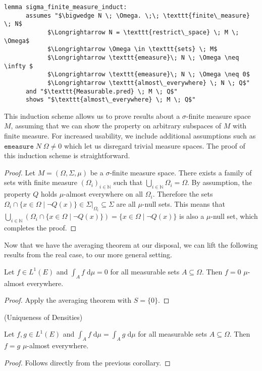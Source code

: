 \begin{isalemma}
{\small
	\begin{lstlisting}[style=isabelle]
	lemma sigma_finite_measure_induct:
	  assumes "$\bigwedge N \; \Omega. \;\; \texttt{finite\_measure} \; N$
			$\Longrightarrow N = \texttt{restrict\_space} \; M \; \Omega$
			$\Longrightarrow \Omega \in \texttt{sets} \; M$
			$\Longrightarrow \texttt{emeasure}\; N \; \Omega \neq \infty $
			$\Longrightarrow \texttt{emeasure}\; N \; \Omega \neq 0$
			$\Longrightarrow \texttt{almost\_everywhere} \; N \; Q$"
	  and "$\texttt{Measurable.pred} \; M \; Q$"
	  shows "$\texttt{almost\_everywhere} \; M \; Q$"
	\end{lstlisting}
}
\end{isalemma}

This induction scheme allows us to prove results about a $\sigma$-finite measure space $M$, assuming that we can show the property on arbitrary subspaces of $M$ with finite measure. For increased usability, we include additional assumptions such as $\texttt{emeasure}\; N \; \Omega \neq 0$ which let us disregard trivial measure spaces. The proof of this induction scheme is straightforward.
\begin{proof}
Let $M = (\Omega, \Sigma, \mu)$ be a $\sigma$-finite measure space. There exists a family of sets with finite measure $(\Omega_i)_{i \in \mathbb{N}}$ such that $\bigcup_{i \in \mathbb{N}} \Omega_i = \Omega$. By assumption, the property $Q$ holds $\mu$-almost everywhere on all $\Omega_i$. Therefore the sets $\Omega_i \cap \{x \in \Omega \;\vert\; \neg Q(x)\} \in \Sigma\vert_{\Omega_i} \subseteq \Sigma$ are all $\mu$-null sets. This means that $\bigcup_{i \in \mathbb{N}} (\Omega_i \cap \{x \in \Omega \;\vert\; \neg Q(x)\}) = \{x \in \Omega \;\vert\; \neg Q(x)\}$ is also a $\mu$-null set, which completes the proof.
\end{proof}

Now that we have the averaging theorem at our disposal, we can lift the following results from the real case, to our more general setting.

\begin{corollary}
	Let $f \in L^1(E)$ and $\int_A f \;\textrm{d}\mu = 0$ for all measurable sets $A \subseteq \Omega$. Then $f = 0$ $\mu$-almost everywhere.
\end{corollary}
\begin{proof}
	Apply the averaging theorem with $S = \{0\}$.
\end{proof}

\begin{corollary}\label{cor:density_unique} (Uniqueness of Densities) \par
	Let $f, g \in L^1(E)$ and $\int_A f \;\textrm{d}\mu = \int_A g \;\textrm{d}\mu$ for all measurable sets $A \subseteq \Omega$. Then $f = g$ $\mu$-almost everywhere.
\end{corollary}
\begin{proof}
	Follows directly from the previous corollary.
\end{proof}

